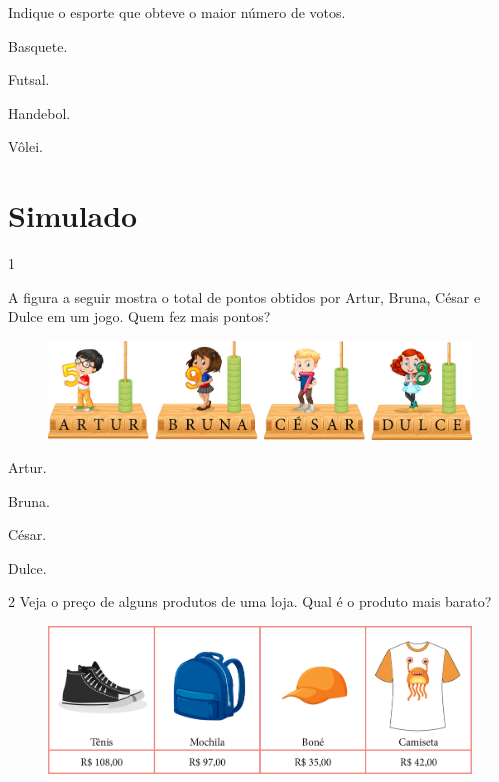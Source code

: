 Indique o esporte que obteve o maior número de votos.

\begin{escolha}[itemsep=-5pt]
\item Basquete.

\item Futsal.

\item Handebol.

\item Vôlei.
\end{escolha}

\chapter[Simulado 2]{Simulado}

\num{1}

A figura a seguir mostra o total de pontos obtidos por Artur, Bruna, César
e Dulce em um jogo. Quem fez mais pontos?

\begin{figure}[H]
\includegraphics[width=\textwidth]{./media/image124.png}
\end{figure}

\begin{escolha}[itemsep=-5pt]
\item Artur.

\item Bruna.

\item César.

\item Dulce.
\end{escolha}

\num{2} Veja o preço de alguns produtos de uma loja. Qual é o produto mais
barato?

\begin{figure}[H]
\includegraphics[width=\textwidth]{./media/image125.png}
\end{figure}

